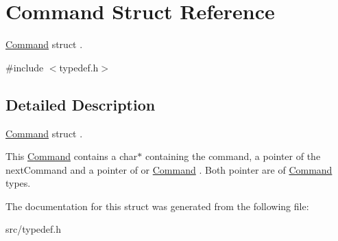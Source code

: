 \hypertarget{structCommand}{}\section{Command Struct Reference}
\label{structCommand}


\hyperlink{structCommand}{Command} struct .  




{\ttfamily \#include $<$typedef.\+h$>$}



\subsection{Detailed Description}
\hyperlink{structCommand}{Command} struct . 

This \hyperlink{structCommand}{Command} contains a char$\ast$ containing the command, a pointer of the next\+Command and a pointer of or \hyperlink{structCommand}{Command} . Both pointer are of \hyperlink{structCommand}{Command} types. 

The documentation for this struct was generated from the following file\+:\begin{DoxyCompactItemize}
\item 
src/typedef.\+h\end{DoxyCompactItemize}
